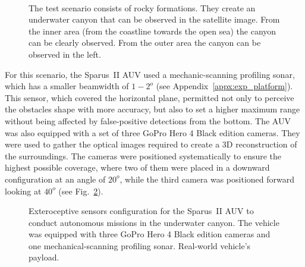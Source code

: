 \begin{figure}[htbp]
\myfloatalign
     \\%
     \quad
\caption[Test scenario of a natural marine formation.]
{The test scenario consists of rocky formations.
\protect {} They create an
underwater canyon that can be observed in the satellite image.
\protect {} From the inner area (\ie from
the coastline towards the open sea) the canyon can be clearly observed.
\protect {} From the outer area the canyon
can be observed in the left.}
\label{fig:RockyFormationCanyon}
\end{figure}

For this scenario, the Sparus~II \ac{AUV} used a mechanic-scanning profiling
sonar, which has a smaller beamwidth of $1-2^o$ (see
Appendix~\ref{appx:exp_platform}). This sensor, which covered the horizontal
plane, permitted not only to perceive the obstacles shape with more accuracy,
but also to set a higher maximum range without being affected by false-positive
detections from the bottom. The \ac{AUV} was also equipped with a set of three
GoPro\texttrademark{} Hero 4 Black edition cameras. They were used to gather the
optical images required to create a \ac{3D} reconstruction of the surroundings.
The cameras were positioned systematically to ensure the highest possible
coverage, where two of them were placed in a downward configuration at an angle
of $20^o$, while the third camera was positioned forward looking at $40^o$ (see
Fig.~\ref{fig:S2ProfCamsPayloadConf}).

\begin{figure}[htbp]
\myfloatalign
	\quad
\caption[Exteroceptive sensors configuration for the Sparus~II AUV to conduct
autonomous missions in the underwater canyon.]
{Exteroceptive sensors configuration for the Sparus~II AUV to conduct autonomous
missions in the underwater canyon.
\protect {} The vehicle was equipped with
three GoPro\texttrademark{} Hero 4 Black edition cameras and one
mechanical-scanning profiling sonar.
\protect {} Real-world vehicle's payload.}
\label{fig:S2ProfCamsPayloadConf}
\end{figure}

